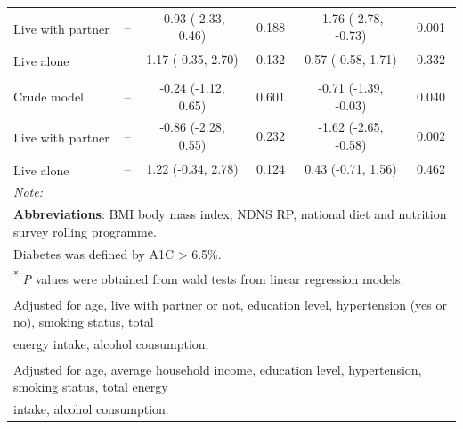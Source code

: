 \begin{table}[H]
\begin{tabular}[t]{lccccc}
		\hspace{1em}\hspace{1em}Live with partner\textsuperscript{\ddag} & -- & -0.93 (-2.33, 0.46) & 0.188 & -1.76 (-2.78, -0.73) & 0.001\\
		\hspace{1em}\hspace{1em}Live alone\textsuperscript{\ddag} & -- & 1.17 (-0.35, 2.70) & 0.132 & 0.57 (-0.58, 1.71) & 0.332\\
		\addlinespace[0.3em]
		\multicolumn{6}{l}{\hspace{1em}\textbf{BMI in non-diabetics}}\\
		\hspace{1em}\hspace{1em}Crude model & -- & -0.24 (-1.12, 0.65) & 0.601 & -0.71 (-1.39, -0.03) & 0.040\\
		\hspace{1em}\hspace{1em}Live with partner\textsuperscript{\ddag} & -- & -0.86 (-2.28, 0.55) & 0.232 & -1.62 (-2.65, -0.58) & 0.002\\
		\hspace{1em}\hspace{1em}Live alone\textsuperscript{\ddag} & -- & 1.22 (-0.34, 2.78) & 0.124 & 0.43 (-0.71, 1.56) & 0.462\\
    	\bottomrule
		\multicolumn{6}{l}{{\scriptsize \textit{Note: }}}\\
		\multicolumn{6}{l}{{\scriptsize \textbf{Abbreviations}: BMI body mass index; NDNS RP, national diet and nutrition survey rolling programme.}}\\
		\multicolumn{6}{l}{{\scriptsize Diabetes was defined by A1C > 6.5\%.}}\\
		\multicolumn{6}{l}{{\scriptsize \textsuperscript{*} \textit{P} values were obtained from wald tests from linear regression models.}}\\
		\multicolumn{6}{l}{{\scriptsize \textsuperscript{\dag} Adjusted for age, live with partner or not, education level, hypertension (yes or no), smoking status, total }}\\
		\multicolumn{6}{l}{{\scriptsize  energy intake, alcohol consumption;}}\\
		\multicolumn{6}{l}{{\scriptsize \textsuperscript{\ddag} Adjusted for age, average household income, education level, hypertension, smoking status, total energy}}\\ 
		\multicolumn{6}{l}{{\scriptsize  intake, alcohol consumption.}}\\
	\end{tabular}
\end{table}

